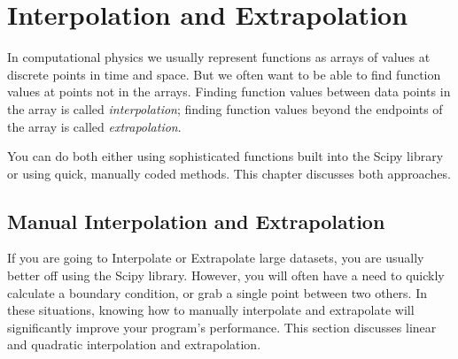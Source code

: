 \chapter{Interpolation and Extrapolation}

\label{chap:interp} 

In computational physics we usually represent functions as arrays of values at
discrete points in time and space. But we often want to be able to find
function values at points not in the arrays. Finding function values between
data points in the array is called {\it interpolation}; finding function
values beyond the endpoints of the array is called {\it extrapolation}.

You can do both either using sophisticated functions built into the Scipy library or using quick, manually coded methods.  This chapter discusses both approaches.

%
%
%


\medskip


\section{Manual Interpolation and Extrapolation}
If you are going to Interpolate or Extrapolate large datasets, you are usually better off using the Scipy library.  However, you will often have a need to quickly calculate a boundary condition, or grab a single point between two others.  In these situations, knowing how to manually interpolate and extrapolate will significantly improve your program's performance. This section discusses linear and quadratic interpolation and extrapolation.
